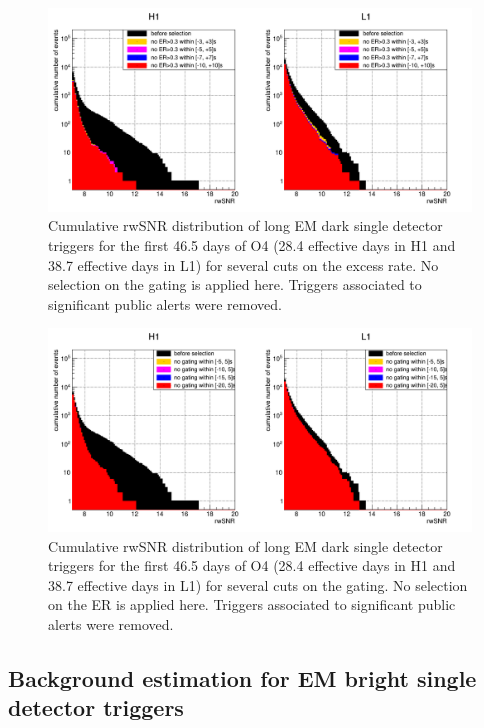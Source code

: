 \begin{figure}
  \centering
  \includegraphics[width=\linewidth]{sectionO4/compareCutER_dark.png}
  \caption{Cumulative rwSNR distribution of long EM dark single detector triggers for the first 46.5 days of O4 (28.4 effective days in H1 and 38.7 effective days in L1) for several cuts on the excess rate. No selection on the gating is applied here. Triggers associated to significant public alerts were removed.}
  \label{fig:cutER_dark_O4}
\end{figure}
%
\begin{figure}
  \centering
  \includegraphics[width=\linewidth]{sectionO4/compareCutGating_dark.png}
  \caption{Cumulative rwSNR distribution of long EM dark single detector triggers for the first 46.5 days of O4 (28.4 effective days in H1 and 38.7 effective days in L1) for several cuts on the gating. No selection on the ER is applied here. Triggers associated to significant public alerts were removed.}
  \label{fig:cutGating_dark_O4}
\end{figure}



\clearpage
\subsection{Background estimation for EM bright single detector triggers}

